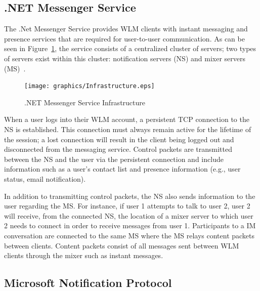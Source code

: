\documentclass{sig-alternate}
\begin{document}
\subsection{.NET Messenger Service}

The .Net Messenger Service provides WLM clients with instant messaging and presence services that are required for user-to-user communication.
As can be seen in Figure~\ref{fig:wlminfrastructure}, the service consists of a centralized cluster of servers; two types of servers exist within this cluster: notification servers (NS) and mixer servers (MS)~\cite{torre:wlm}.

\begin{figure}[h]
	\centering
	\caption{.NET Messenger Service Infrastructure}
	\label{fig:wlminfrastructure}
	\texttt{[image: graphics/Infrastructure.eps]}
\end{figure}

When a user logs into their WLM account, a persistent TCP connection to the NS is established.
This connection must always remain active for the lifetime of the session; a lost connection will result in the client being logged out and disconnected from the messaging service.
Control packets are transmitted between the NS and the user via the persistent connection and include information such as a user's contact list and presence information (e.g., user status, email notification).

In addition to transmitting control packets, the NS also sends information to the user regarding the MS.
For instance, if user 1 attempts to talk to user 2, user 2 will receive, from the connected NS, the location of a mixer server to which user 2 needs to connect in order to receive messages from user 1.
Participants to a IM conversation are connected to the same MS where the MS relays content packets between clients.
Content packets consist of all messages sent between WLM clients through the mixer such as instant messages.

\subsection{Microsoft Notification Protocol}
\end{document}
